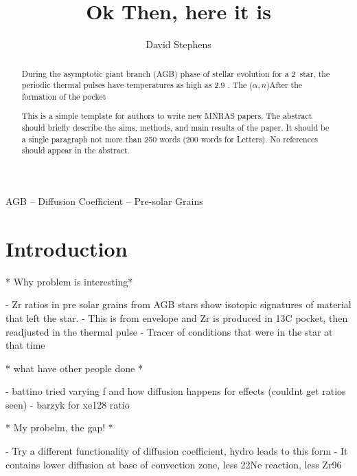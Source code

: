 \documentclass[fleqn,usenatbib]{mnras}
\title[Short title, max. 45 characters]{Ok Then, here it is}
\author[D. Stephens]{
David Stephens}
\begin{document}
\label{firstpage}
\pagerange{\pageref{firstpage}--\pageref{lastpage}}
\maketitle

\begin{abstract}
During the asymptotic giant branch (AGB) phase of stellar evolution for a 2\Msun~star, the periodic thermal pulses have temperatures as high as 2.9 \K. The \neon[22]($\alpha,n$)\magnesium[25]
After the formation of the \carbon[13] pocket 

This is a simple template for authors to write new MNRAS papers.
The abstract should briefly describe the aims, methods, and main results of the paper.
It should be a single paragraph not more than 250 words (200 words for Letters).
No references should appear in the abstract.
\end{abstract}

\begin{keywords}
AGB -- Diffusion Coefficient -- Pre-solar Grains
\end{keywords}



\section{Introduction}


* Why problem is interesting*

- Zr ratios in pre solar grains from AGB stars show isotopic signatures of material that left the star. 
- This is from envelope and Zr is produced in 13C pocket, then readjusted in the thermal pulse
- Tracer of conditions that were in the star at that time

* what have other people done *

- battino tried varying f and how diffusion happens for effects (couldnt get ratios seen)
- barzyk for xe128 ratio 

* My probelm, the gap! *

- Try a different functionality of diffusion coefficient, hydro leads to this form
- It contains lower diffusion at base of convection zone, less 22Ne reaction, less Zr96
\end{document}

